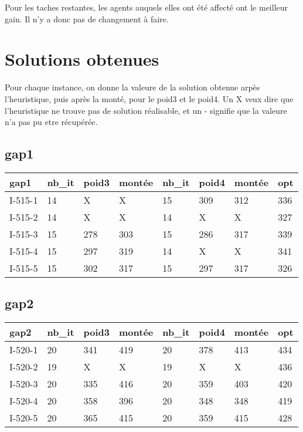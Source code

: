\documentclass[a4paper,12pt,titlepage]{report}
\begin{document}
Pour les taches restantes, les agents auquels elles ont été affecté ont le meilleur gain. Il n'y a donc pas de changement à faire.

\chapter{Solutions obtenues}

Pour chaque instance, on donne la valeure de la solution obtenue arpès l'heuristique, puis après la monté, pour le poid3 et le poid4.
Un X veux dire que l'heuristique ne trouve pas de solution réalisable, et un - signifie que la valeure n'a pas pu etre récupérée.

\section{gap1}

\begin{tabular}{|l|l|l|l|l|l|l|l|}
  \hline
  gap1 & nb\_it & poid3 & montée & nb\_it & poid4 & montée & opt \\
  \hline
  I-515-1 & 14 & X & X & 15 & 309 & 312 & 336  \\
   I-515-2 & 14 & X & X & 14 & X & X & 327  \\
 I-515-3 & 15 & 278 & 303 & 15 & 286 & 317 & 339 \\
 I-515-4 & 15 & 297 & 319 & 14 & X & X & 341  \\
 I-515-5 & 15 & 302 & 317 & 15 & 297 & 317 & 326  \\
  \hline
\end{tabular}

\section{gap2}

\begin{tabular}{|l|l|l|l|l|l|l|l|}
  \hline
  gap2 & nb\_it & poid3 & montée & nb\_it & poid4 & montée & opt \\
  \hline
  I-520-1 & 20 & 341 & 419 & 20 & 378 & 413 & 434  \\
  I-520-2 & 19 & X & X & 19 & X & X & 436  \\
  I-520-3 & 20 & 335 & 416 & 20 & 359 & 403 & 420  \\
  I-520-4 & 20 & 358 & 396 & 20 & 348 & 348 & 419  \\
  I-520-5 & 20 & 365 & 415 & 20 & 359 & 415 & 428  \\
  \hline
\end{tabular}
\end{document}
